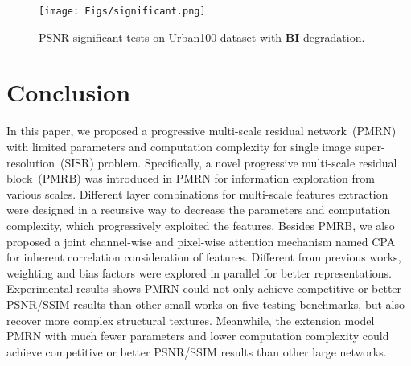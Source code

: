 \documentclass[journal]{IEEEtran}
\begin{document}
\begin{figure}
    \centering
    \texttt{[image: Figs/significant.png]}
    \caption{PSNR significant tests on Urban100 dataset with \textbf{BI} degradation.}
    \label{fig:significant}
\end{figure}



\section{Conclusion}
In this paper, we proposed a progressive multi-scale residual network~(PMRN) with limited parameters and computation complexity for single image super-resolution~(SISR) problem. Specifically, a novel progressive multi-scale residual block~(PMRB) was introduced in PMRN for information exploration from various scales. Different layer combinations for multi-scale features extraction were designed in a recursive way to decrease the parameters and computation complexity, which progressively exploited the features. Besides PMRB, we also proposed a joint channel-wise and pixel-wise attention mechanism named CPA for inherent correlation consideration of features. Different from previous works, weighting and bias factors were explored in parallel for better representations. Experimental results shows PMRN could not only achieve competitive or better PSNR/SSIM results than other small works on five testing benchmarks, but also recover more complex structural textures. Meanwhile, the extension model PMRN with much fewer parameters and lower computation complexity could achieve competitive or better PSNR/SSIM results than other large networks.


	
\end{document}
